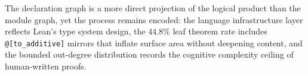 The declaration graph is a more direct projection of the logical product than the module graph, yet the process remains encoded: the language infrastructure layer reflects Lean's type system design, the $44.8\%$ leaf theorem rate includes \texttt{@[to\_additive]} mirrors that inflate surface area without deepening content, and the bounded out-degree distribution records the cognitive complexity ceiling of human-written proofs.
